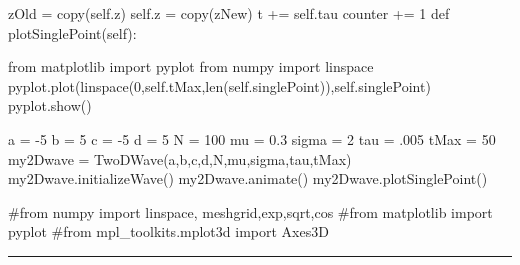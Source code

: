 \begin{codeexample}
\begin{VerbatimOut}{\listingFile}
            zOld = copy(self.z)
            self.z = copy(zNew)
            t += self.tau
            counter += 1
    def plotSinglePoint(self):

        from matplotlib import pyplot
        from numpy import linspace
        pyplot.plot(linspace(0,self.tMax,len(self.singlePoint)),self.singlePoint)
        pyplot.show()

a = -5
b = 5
c = -5
d = 5
N = 100
mu = 0.3
sigma = 2
tau = .005
tMax = 50
my2Dwave = TwoDWave(a,b,c,d,N,mu,sigma,tau,tMax)
my2Dwave.initializeWave()
my2Dwave.animate()
my2Dwave.plotSinglePoint()

#from numpy import linspace, meshgrid,exp,sqrt,cos
#from matplotlib import pyplot
#from mpl_toolkits.mplot3d import Axes3D
\end{VerbatimOut}
\end{codeexample}
\else
\noindent\rule{5 in}{0.01 in}
\fi

